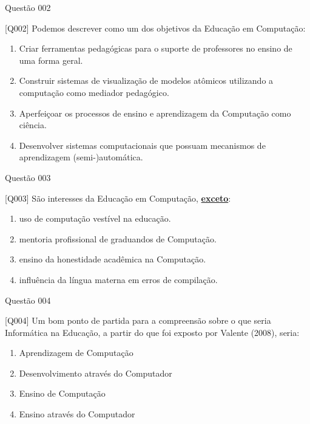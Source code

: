\documentclass[xcolor=dvipsnames,table]{beamer}
\begin{document}
        \begin{frame}{Questão 002}
		\begin{block}{[Q002]}
			Podemos descrever como um dos objetivos da Educação em Computação:
		\end{block}
		\begin{enumerate}[label=(\Alph*)]
			\item Criar ferramentas pedagógicas para o suporte de professores no ensino de uma forma geral.
			\item Construir sistemas de visualização de modelos atômicos utilizando a computação como mediador pedagógico.
			\item Aperfeiçoar os processos de ensino e aprendizagem da Computação como ciência.
			\item Desenvolver sistemas computacionais que possuam mecanismos de aprendizagem (semi-)automática.
		\end{enumerate}
	\end{frame}

        \begin{frame}{Questão 003}
		\begin{block}{[Q003]}
			São interesses da Educação em Computação, \underline{{\bf exceto}}:
		\end{block}
		\begin{enumerate}[label=(\Alph*)]
			\item uso de computação vestível na educação.
			\item mentoria profissional de graduandos de Computação.
			\item ensino da honestidade acadêmica na Computação.
			\item influência da língua materna em erros de compilação.
		\end{enumerate}
	\end{frame}

        \begin{frame}{Questão 004}
		\begin{block}{[Q004]}
			Um bom ponto de partida para a compreensão sobre o que seria Informática na Educação, a partir do que foi exposto por Valente (2008), seria:
		\end{block}
		\begin{enumerate}[label=(\Alph*)]
			\item Aprendizagem de Computação
			\item Desenvolvimento através do Computador
			\item Ensino de Computação
			\item Ensino através do Computador
		\end{enumerate}
	\end{frame}
\end{document}
